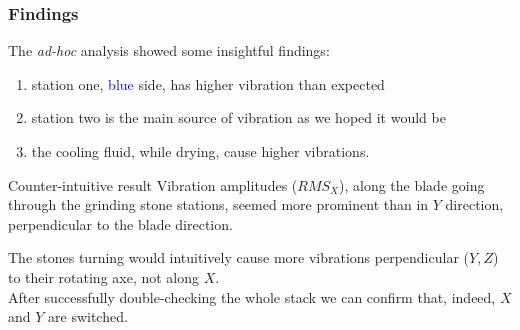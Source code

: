 \begin{frame}
    \frametitle{Findings}
    \vspace*{\fill}

    The \textit{ad-hoc} analysis showed some insightful findings:
    \begin{enumerate}
        \item station one, \textcolor{blue}{blue} side, has higher vibration than expected
        \item station two is the main source of vibration as we hoped it would be
        \item the cooling fluid, while drying, cause higher vibrations.
    \end{enumerate}

    \begin{alertblock}{Counter-intuitive result}
        Vibration amplitudes ($RMS_{X}$), along the blade going through the grinding stone stations, seemed more
        prominent than in $Y$ direction, perpendicular to the blade direction.
    \end{alertblock}

    The stones turning would intuitively cause
    more vibrations perpendicular ($Y, Z$) to their rotating axe, not along $X$.\\
    After successfully double-checking the whole stack we can confirm that, indeed, $X$ and $Y$ are  switched.
    \vspace*{\fill}
\end{frame}